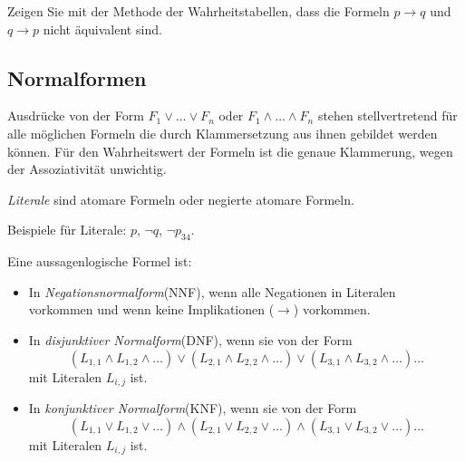 \begin{ueb}
    Zeigen Sie mit der Methode der Wahrheitstabellen, dass die Formeln $p\to q$ und $q\to p$ nicht äquivalent sind.
\end{ueb}
\begin{lsg}
\end{lsg}


\subsection*{Normalformen}

\begin{rk}
Ausdrücke von der Form $F_1\lor\dots\lor F_n$ oder $F_1\land\dots\land F_n$ stehen stellvertretend für alle möglichen Formeln die durch Klammersetzung aus ihnen gebildet werden können. Für den Wahrheitswert der Formeln ist die genaue Klammerung, wegen der Assoziativität unwichtig.
\end{rk}

\begin{df}
\textit{Literale} sind atomare Formeln oder negierte atomare Formeln.
\end{df}

\begin{bsp}
Beispiele für Literale: $p$, $\neg q$, $\neg p_{34}$.
\end{bsp}

\begin{df}
Eine aussagenlogische Formel ist:
\begin{itemize}
\item In \textit{Negationsnormalform}(NNF), wenn alle Negationen in Literalen vorkommen und wenn keine Implikationen ($\to$) vorkommen.
\item In \textit{disjunktiver Normalform}(DNF), wenn sie von der Form
\[
(L_{1,1}\land L_{1,2}\land\dots)\lor(L_{2,1}\land L_{2,2}\land\dots)\lor(L_{3,1}\land L_{3,2}\land\dots)\dots
\]
mit Literalen $L_{i,j}$ ist.
\item In \textit{konjunktiver Normalform}(KNF), wenn sie von der Form
\[
(L_{1,1}\lor L_{1,2}\lor\dots)\land(L_{2,1}\lor L_{2,2}\lor\dots)\land(L_{3,1}\lor L_{3,2}\lor\dots)\dots
\]
mit Literalen $L_{i,j}$ ist.
\end{itemize}
\end{df}

